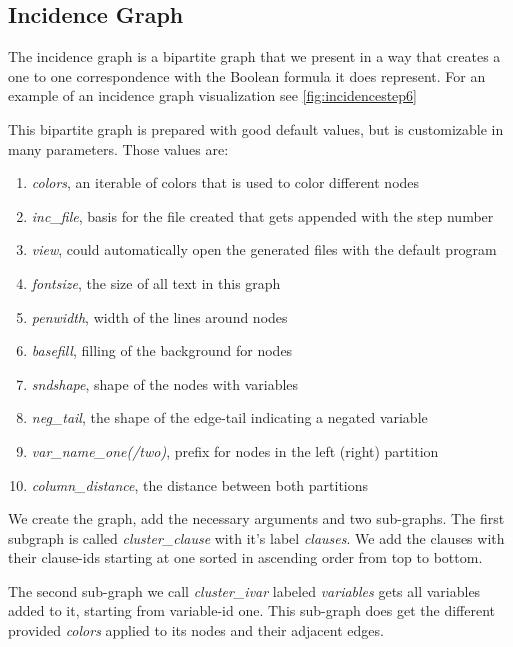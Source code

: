 \documentclass[a4paper, 12pt]{scrartcl}
\begin{document}
\subsection{Incidence Graph}\label{sec:incid}
The incidence graph is a bipartite graph that we present in a way that creates a one to one correspondence with the 
Boolean formula it does represent. For an example of an incidence graph visualization see \ref{fig:incidencestep6}

This bipartite graph is prepared with good default values, but is customizable in many parameters.
Those values are:

\begin{enumerate}
	\item \textit{colors}, an iterable of colors that is used to color different nodes
	\item \textit{inc\_file}, basis for the file created that gets appended with the step number
	\item \textit{view}, could automatically open the generated files with the default program
	\item \textit{fontsize}, the size of all text in this graph
	\item \textit{penwidth}, width of the lines around nodes
	\item \textit{basefill}, filling of the background for nodes
	\item \textit{sndshape}, shape of the nodes with variables
	\item \textit{neg\_tail}, the shape of the edge-tail indicating a negated variable
	\item \textit{var\_name\_one(/two)}, prefix for nodes in the left (right) partition
	\item \textit{column\_distance}, the distance between both partitions
\end{enumerate}

We create the graph, add the necessary arguments and two sub-graphs. 
The first subgraph is called \textit{cluster\_clause} with it's label \textit{clauses}.
We add the clauses with their clause-ids starting at one sorted in ascending order from top to bottom.

The second sub-graph we call \textit{cluster\_ivar} labeled \textit{variables} gets all variables added to it, 
starting from variable-id one. 
This sub-graph does get the different provided \textit{colors} applied to its nodes and their adjacent edges.
\end{document}
